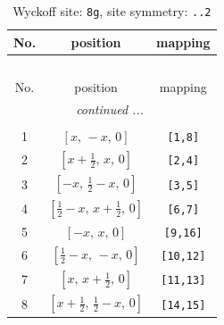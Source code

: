 \documentclass[fleqn,8pt]{jsarticle}
\begin{document}
\renewcommand{\arraystretch}{1.2}
\begin{longtable}{ccc}
\caption{Wyckoff site: {\tt 8g}, site symmetry: {\tt ..2}}
 \\
 \hline \hline
No. & position & mapping \\ \hline \endfirsthead

\multicolumn{2}{l}{\tablename\ \thetable{}} \\
 \hline \hline
No. & position & mapping \\ \hline \endhead

 \hline \hline
\multicolumn{2}{r}{\footnotesize\it continued ...} \\ \endfoot

 \hline \hline
\multicolumn{2}{r}{} \\ \endlastfoot

1 & $\left[ x,\, - x,\, 0 \right]$ & {\tt [1,8]} \\ \hline
2 & $\left[ x + \frac{1}{2},\, x,\, 0 \right]$ & {\tt [2,4]} \\ \hline
3 & $\left[ - x,\, \frac{1}{2} - x,\, 0 \right]$ & {\tt [3,5]} \\ \hline
4 & $\left[ \frac{1}{2} - x,\, x + \frac{1}{2},\, 0 \right]$ & {\tt [6,7]} \\ \hline
5 & $\left[ - x,\, x,\, 0 \right]$ & {\tt [9,16]} \\ \hline
6 & $\left[ \frac{1}{2} - x,\, - x,\, 0 \right]$ & {\tt [10,12]} \\ \hline
7 & $\left[ x,\, x + \frac{1}{2},\, 0 \right]$ & {\tt [11,13]} \\ \hline
8 & $\left[ x + \frac{1}{2},\, \frac{1}{2} - x,\, 0 \right]$ & {\tt [14,15]} \\
\end{longtable}
\renewcommand{\arraystretch}{1.2}
\end{document}
